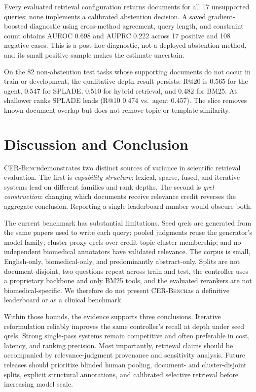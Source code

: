\documentclass{article}
\newcommand{\cer}{\textsc{CER-Bench}}
\begin{document}
Every evaluated retrieval configuration returns documents for all 17 unsupported queries; none implements a calibrated abstention decision. A saved gradient-boosted diagnostic using cross-method agreement, query length, and constraint count obtains AUROC 0.698 and AUPRC 0.222 across 17 positive and 108 negative cases. This is a post-hoc diagnostic, not a deployed abstention method, and its small positive sample makes the estimate uncertain.

On the 82 non-abstention test tasks whose supporting documents do not occur in train or development, the qualitative depth result persists: R@20 is 0.565 for the agent, 0.547 for SPLADE, 0.510 for hybrid retrieval, and 0.482 for BM25. At shallower ranks SPLADE leads (R@10 0.474 vs.\ agent 0.457). The slice removes known document overlap but does not remove topic or template similarity.

\section{Discussion and Conclusion}
\label{sec:conclusion}

\cer demonstrates two distinct sources of variance in scientific retrieval evaluation. The first is \emph{capability structure}: lexical, sparse, fused, and iterative systems lead on different families and rank depths. The second is \emph{qrel construction}: changing which documents receive relevance credit reverses the aggregate conclusion. Reporting a single leaderboard number would obscure both.

The current benchmark has substantial limitations. Seed qrels are generated from the same papers used to write each query; pooled judgments reuse the generator's model family; cluster-proxy qrels over-credit topic-cluster membership; and no independent biomedical annotators have validated relevance. The corpus is small, English-only, biomedical-only, and predominantly abstract-only. Splits are not document-disjoint, two questions repeat across train and test, the controller uses a proprietary backbone and only BM25 tools, and the evaluated rerankers are not biomedical-specific. We therefore do not present \cer as a definitive leaderboard or as a clinical benchmark.

Within those bounds, the evidence supports three conclusions. Iterative reformulation reliably improves the same controller's recall at depth under seed qrels. Strong single-pass systems remain competitive and often preferable in cost, latency, and ranking precision. Most importantly, retrieval claims should be accompanied by relevance-judgment provenance and sensitivity analysis. Future releases should prioritize blinded human pooling, document- and cluster-disjoint splits, explicit structural annotations, and calibrated selective retrieval before increasing model scale.
\label{page:mainend}
\end{document}
